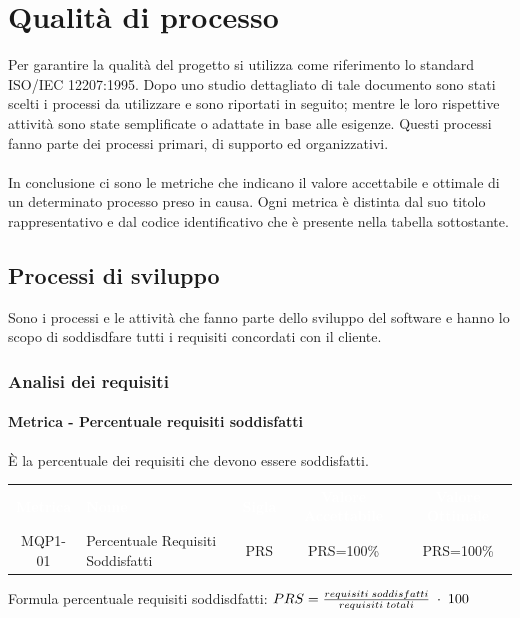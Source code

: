 \section{Qualità di processo}
Per garantire la qualità del progetto si utilizza come riferimento lo standard ISO/IEC 12207:1995. Dopo uno studio dettagliato di tale documento sono stati scelti i processi da utilizzare e sono riportati in seguito; mentre le loro rispettive attività sono state semplificate o adattate in base alle esigenze. Questi processi fanno parte dei processi primari, di supporto ed organizzativi. \\ \\ 
In conclusione ci sono le metriche che indicano il valore accettabile e ottimale di un determinato processo preso in causa. Ogni metrica è distinta dal suo titolo rappresentativo e dal codice identificativo che è presente nella tabella sottostante.

\subsection{Processi di sviluppo}
Sono i processi e le attività che fanno parte dello sviluppo del software e hanno lo scopo di soddisdfare tutti i requisiti concordati con il cliente.
    \subsubsection{Analisi dei requisiti}
        \paragraph{Metrica - Percentuale requisiti soddisfatti}
        È la percentuale dei requisiti che devono essere soddisfatti.

        \renewcommand{\arraystretch}{1.5}
        \begin{longtable}{ c C{4cm} c c c}
        \textcolor{white}{\textbf{Metrica}} & \textcolor{white}{\textbf{Nome}} & \textcolor{white}{\textbf{Sigla}} & \textcolor{white}{\textbf{Valore Accettabile}} & \textcolor{white}{\textbf{Valore Ottimale}}\\
        MQP1-01 & Percentuale Requisiti Soddisfatti & PRS & PRS=100\% & PRS=100\% \\	     
        \end{longtable}
        Formula percentuale requisiti soddisdfatti: \begin{math}{PRS = {requisiti \; soddisfatti \over requisiti \; totali}\; \cdot \; 100}\end{math}

